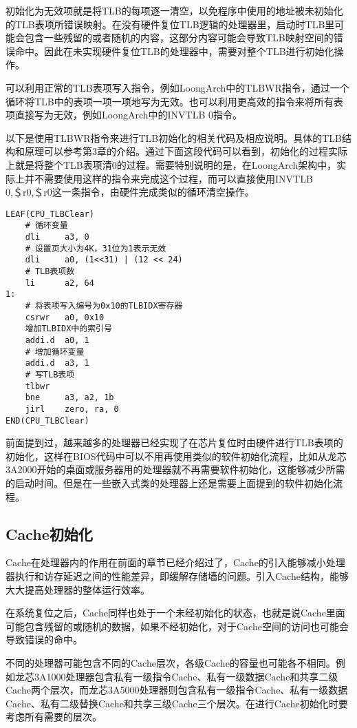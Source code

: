 \documentclass[]{ctexbook}
\begin{document}
初始化为无效项就是将TLB的每项逐一清空，以免程序中使用的地址被未初始化的TLB表项所错误映射。在没有硬件复位TLB逻辑的处理器里，启动时TLB里可能会包含一些残留的或者随机的内容，这部分内容可能会导致TLB映射空间的错误命中。因此在未实现硬件复位TLB的处理器中，需要对整个TLB进行初始化操作。

可以利用正常的TLB表项写入指令，例如LoongArch中的TLBWR指令，通过一个循环将TLB中的表项一项一项地写为无效。也可以利用更高效的指令来将所有表项直接写为无效，例如LoongArch中的INVTLB 0指令。

以下是使用TLBWR指令来进行TLB初始化的相关代码及相应说明。具体的TLB结构和原理可以参考第3章的介绍。通过下面这段代码可以看到，初始化的过程实际上就是将整个TLB表项清0的过程。需要特别说明的是，在LoongArch架构中，实际上并不需要使用这样的指令来完成这个过程，而可以直接使用INVTLB 0,＄r0,＄r0这一条指令，由硬件完成类似的循环清空操作。

\begin{verbatim}
LEAF(CPU_TLBClear)
    # 循环变量
    dli     a3, 0
    # 设置页大小为4K，31位为1表示无效
    dli     a0, (1<<31) | (12 << 24)
    # TLB表项数
    li      a2, 64
1:
    # 将表项写入编号为0x10的TLBIDX寄存器
    csrwr   a0, 0x10
    增加TLBIDX中的索引号
    addi.d  a0, 1
    # 增加循环变量
    addi.d  a3, 1
    # 写TLB表项
    tlbwr
    bne     a3, a2, 1b
    jirl    zero, ra, 0
END(CPU_TLBClear)
\end{verbatim}

前面提到过，越来越多的处理器已经实现了在芯片复位时由硬件进行TLB表项的初始化，这样在BIOS代码中可以不用再使用类似的软件初始化流程，比如从龙芯3A2000开始的桌面或服务器用的处理器就不再需要软件初始化，这能够减少所需的启动时间。但是在一些嵌入式类的处理器上还是需要上面提到的软件初始化流程。

\hypertarget{cacheux521dux59cbux5316}{%
\subsection{Cache初始化}\label{cacheux521dux59cbux5316}}

Cache在处理器内的作用在前面的章节已经介绍过了，Cache的引入能够减小处理器执行和访存延迟之间的性能差异，即缓解存储墙的问题。引入Cache结构，能够大大提高处理器的整体运行效率。

在系统复位之后，Cache同样也处于一个未经初始化的状态，也就是说Cache里面可能包含残留的或随机的数据，如果不经初始化，对于Cache空间的访问也可能会导致错误的命中。

不同的处理器可能包含不同的Cache层次，各级Cache的容量也可能各不相同。例如龙芯3A1000处理器包含私有一级指令Cache、私有一级数据Cache和共享二级Cache两个层次，而龙芯3A5000处理器则包含私有一级指令Cache、私有一级数据Cache、私有二级替换Cache和共享三级Cache三个层次。在进行Cache初始化时要考虑所有需要的层次。
\end{document}
